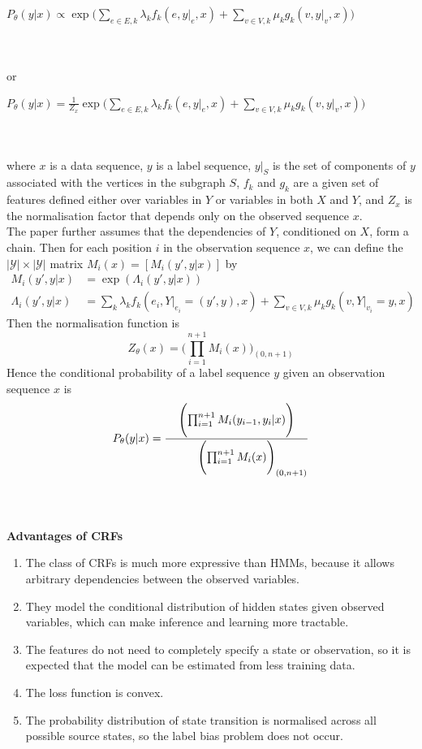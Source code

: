 \documentclass[]{article}
\begin{document}
\centerline{$P_\theta(y|x)\propto \exp\Biggl(\sum\limits_{e \in E,k}\lambda_kf_k(e,y|_e,x) + \sum\limits_{v \in V,k}\mu_kg_k(v,y|_v,x)\Biggr)$} 
\\ \\ 
or \hspace*{-0.4cm}\centerline{$P_\theta(y|x)=\frac{1}{Z_x} \exp\Biggl(\sum\limits_{e \in E,k}\lambda_kf_k(e,y|_e,x) + \sum\limits_{v \in V,k}\mu_kg_k(v,y|_v,x)\Biggr)$} 
\\ \\
where $x$ is a data sequence, $y$ is a label sequence, $y|_S$ is the set of components of $y$ associated with the vertices in the subgraph $S$, $f_k$ and $g_k$ are a given set of features defined either over variables in $Y$ or variables in both $X$ and $Y$, and $Z_x$ is the normalisation factor that depends only on the observed sequence $x$.\vspace*{0.1cm}\\The paper further assumes that the dependencies of $Y$, conditioned on $X$, form a chain. Then for each position $i$ in the observation sequence $x$, we can define the $|\mathcal{Y}|\times|\mathcal{Y}|$ matrix $M_i(x)=[M_i(y',y|x)]$ by
\begin{align*}
M_i(y',y|x)&=\exp(\Lambda_i(y',y|x)) \\
\Lambda_i(y',y|x) & = \sum\limits_{k}\lambda_kf_k(e_i,Y|_{e_i}=(y',y),x) + \sum\limits_{v \in V,k}\mu_kg_k(v,Y|_{v_i}=y,x)
\end{align*}
Then the normalisation function is
\begin{equation*}
Z_\theta(x) = \Biggl(\prod_{i=1}^{n+1}M_i(x)\Biggr)_{(0, n+1)}
\end{equation*}
Hence the conditional probability of a label sequence $y$ given an observation sequence $x$ is
\begin{equation*}
P_\theta(y|x) = \frac{\Biggl(\prod_{i=1}^{n+1}M_i(y_{i-1},y_i|x)\Biggr)}{\hspace*{1cm}\Biggl(\prod_{i=1}^{n+1}M_i(x)\Biggr)_{(0, n+1)}}
\end{equation*}
\\ \\
\centerline{\bfseries Advantages of CRFs}
\begin{enumerate}[leftmargin=*]
\item The class of CRFs is much more expressive than HMMs, because it allows arbitrary dependencies between the observed variables.
\item They model the conditional distribution of hidden states given observed variables, which can make inference and learning more tractable.
\item The features do not need to completely specify a state or observation, so it is expected that the model can be estimated from less training data.
\item The loss function is convex.
\item The probability distribution of state transition is normalised across all possible source states, so the label bias problem does not occur.
\end{enumerate} 
\end{document}
